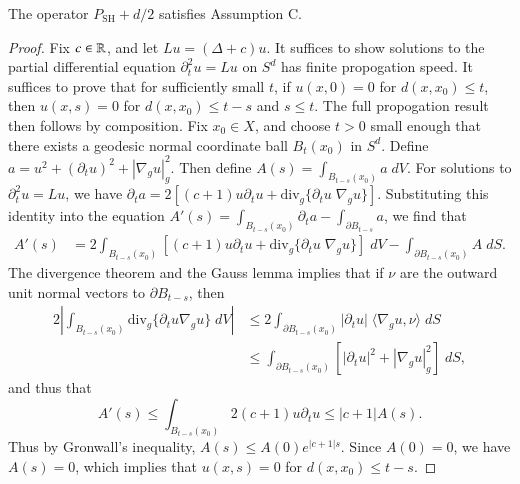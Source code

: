 \begin{lemma}
  The operator $P_{\text{SH}} + d/2$ satisfies Assumption C.
\end{lemma}
\begin{proof}
  Fix $c \in \operatorname{\mathbb{R}}$, and let $Lu = (\Delta + c) u$. It suffices to show solutions to the partial differential equation $\partial_t^2 u = Lu$ on $S^d$ has finite propogation speed. It suffices to prove that for sufficiently small $t$, if $u(x,0) = 0$ for $d(x,x_0) \leq t$, then $u(x,s) = 0$ for $d(x,x_0) \leq t - s$ and $s \leq t$. The full propogation result then follows by composition. Fix $x_0 \in X$, and choose $t > 0$ small enough that there exists a geodesic normal coordinate ball $B_t(x_0)$ in $S^d$. Define $a = u^2 + (\partial_t u)^2 + |\nabla_g u|_g^2$. Then define $A(s) = \int_{B_{t-s}(x_0)} a\; dV$. For solutions to $\partial_t^2 u = Lu$, we have $\partial_t a = 2[ (c + 1) u \partial_t u + \text{div}_g \{ \partial_t u\; \nabla_g u \} ]$.
  Substituting this identity into the equation $A'(s) = \int_{B_{t-s}(x_0)} \partial_t a - \int_{\partial B_{t-s}} a$, we find that
  \begin{equation}
  \begin{split}
    A'(s) &= 2 \int_{B_{t-s}(x_0)} [(c+1) u \partial_t u + \text{div}_g \{ \partial_t u\; \nabla_g u \}]\; dV - \int_{\partial B_{t-s}(x_0)} A\; dS.
  \end{split}
  \end{equation}
  The divergence theorem and the Gauss lemma implies that if $\nu$ are the outward unit normal vectors to $\partial B_{t-s}$, then
  \begin{equation}
  \begin{split}
    2 \left| \int_{B_{t-s}(x_0)} \text{div}_g \{ \partial_t u \nabla_g u \}\; dV \right| &\leq 2 \int_{\partial B_{t-s}(x_0)} |\partial_t u|\; \langle \nabla_g u, \nu \rangle\; dS\\\
    &\leq \int_{\partial B_{t-s}(x_0)} [|\partial_t u|^2 + |\nabla_g u|_g^2]\; dS,
  \end{split}
  \end{equation}
  and thus that
  \begin{equation}
    A'(s) \leq \int_{B_{t-s}(x_0)} 2(c+1) u \partial_t u \leq |c + 1| A(s).
  \end{equation}
  Thus by Gronwall's inequality, $A(s) \leq A(0) e^{|c+1|s}$. Since $A(0) = 0$, we have $A(s) = 0$, which implies that $u(x,s) = 0$ for $d(x,x_0) \leq t - s$.
\end{proof}

